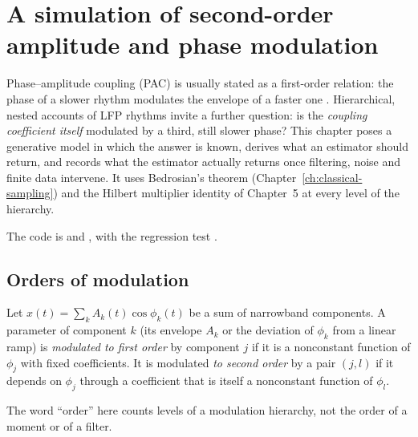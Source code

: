 \chapter[Second-order modulation]{A simulation of second-order amplitude and phase modulation}
\label{ch:second-order-modulation}
Phase--amplitude coupling (PAC) is usually stated as a first-order
relation: the phase of a slower rhythm modulates the envelope of a faster
one \cite{canolty2006,tort2010}. Hierarchical, nested accounts of LFP
rhythms \cite{hyafil2015} invite a further question: is the
\emph{coupling coefficient itself} modulated by a third, still slower
phase? This chapter poses a generative model in which the answer is known,
derives what an estimator should return, and records what the estimator
actually returns once filtering, noise and finite data intervene. It uses
Bedrosian's theorem (Chapter~\ref{ch:classical-sampling}) and the Hilbert
multiplier identity of Chapter~5 at every level of the hierarchy.

The code is  and
, with the regression test
.

\section{Orders of modulation}
\begin{definition}
Let $x(t)=\sum_k A_k(t)\cos\phi_k(t)$ be a sum of narrowband components.
A parameter of component $k$ (its envelope $A_k$ or the deviation of
$\phi_k$ from a linear ramp) is \emph{modulated to first order} by
component $j$ if it is a nonconstant function of $\phi_j$ with fixed
coefficients. It is modulated \emph{to second order} by a pair $(j,l)$
if it depends on $\phi_j$ through a coefficient that is itself a
nonconstant function of $\phi_l$.
\end{definition}
The word ``order'' here counts levels of a modulation hierarchy, not the
order of a moment or of a filter.

